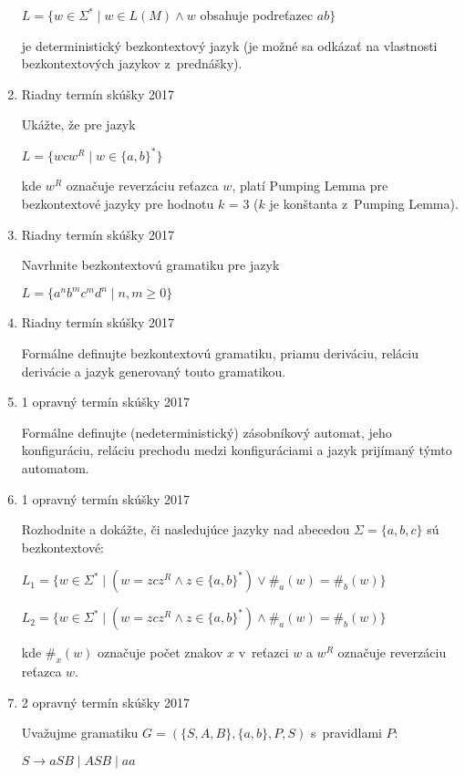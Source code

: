 \documentclass[]{article}
\begin{document}
\begin{enumerate}
		$L = \{w \in \Sigma^* \mid w \in L(M) \land w$ obsahuje podreťazec $ab\}$
		
		je deterministický bezkontextový jazyk (je možné sa odkázať na vlastnosti bezkontextových jazykov z~prednášky).
		
		\item Riadny termín skúšky 2017
		
		Ukážte, že pre jazyk
		
		$L = \{wcw^R \mid w \in \{a,b\}^*\}$
		
		kde $w^R$ označuje reverzáciu reťazca $w$, platí Pumping Lemma pre bezkontextové jazyky pre hodnotu $k$ = 3 ($k$ je konštanta z~Pumping Lemma).
		
		\item Riadny termín skúšky 2017
		
		Navrhnite bezkontextovú gramatiku pre jazyk
		
		$L = \{a^nb^mc^md^n \mid n,m \geq 0\}$
		
		\item Riadny termín skúšky 2017
		
		Formálne definujte bezkontextovú gramatiku, priamu deriváciu, reláciu derivácie a jazyk generovaný touto gramatikou.
		
		\item 1 opravný termín skúšky 2017
		
		Formálne definujte (nedeterministický) zásobníkový automat, jeho konfiguráciu, reláciu prechodu medzi konfiguráciami a jazyk prijímaný týmto automatom.
		
		\item 1 opravný termín skúšky 2017
		
		Rozhodnite a dokážte, či nasledujúce jazyky nad abecedou $\Sigma = \{a,b,c\}$ sú bezkontextové:
		
		$L_1 = \{w \in \Sigma^* \mid (w = zcz^R \land z \in \{a,b\}^*) \lor \#_a(w) = \#_b(w)\}$
		
		$L_2 = \{w \in \Sigma^* \mid (w = zcz^R \land z \in \{a,b\}^*) \land \#_a(w) = \#_b(w)\}$
		
		kde $\#_x(w)$ označuje počet znakov $x$ v~reťazci $w$ a $w^R$ označuje reverzáciu reťazca $w$.
		
		\item 2 opravný termín skúšky 2017
		
		Uvažujme gramatiku $G = (\{S,A,B\}, \{a,b\}, P, S)$ s~pravidlami $P$:
		
		$S \rightarrow aSB \mid ASB \mid aa$
		

\end{enumerate}
\end{document}
